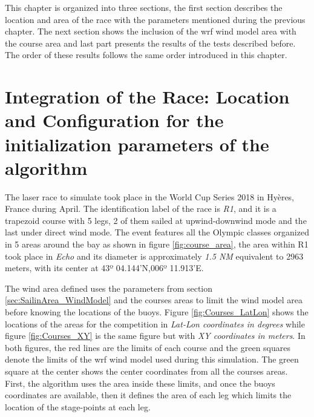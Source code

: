 This chapter is organized into three sections, the first section describes the location and area of the race with the parameters mentioned during the previous chapter. The next section shows the inclusion of the \acrshort{wrf} wind model area with the course area and last part presents the results of the tests described before. The order of these results follows the same order introduced in this chapter.   \par 


\section{Integration of the Race: Location and Configuration for the initialization parameters of the algorithm}\label{sec:details about the place}

The laser race to simulate took place in the World Cup Series 2018 in Hyères, France during April. The identification label of the race is \textit{R1}, and it is a trapezoid course with 5 legs, 2 of them sailed at upwind-downwind mode and the last under direct wind mode. The event features all the Olympic classes organized in 5 areas around the bay as shown in figure \ref{fig:course_area}, the area within R1 took place in \textit{Echo} and its diameter is approximately \textit{1.5 NM} equivalent to 2963 meters, with its center at 43º 04.144'N,006º 11.913'E. %
 \par 
 
The wind area defined uses the parameters from section \ref{sec:SailinArea_WindModel} and the courses areas to limit the wind model area before knowing the locations of the buoys. Figure \ref{fig:Courses_LatLon} shows the locations of the areas for the competition in \textit{Lat-Lon coordinates in degrees} while figure \ref{fig:Courses_XY} is the same figure but with \textit{XY coordinates in meters}. In both figures, the red lines are the limits of each course and the green squares denote the limits of the \acrshort{wrf} wind model used during this simulation. The green square at the center shows the center coordinates from all the courses areas. First, the algorithm uses the area inside these limits, and once the buoys coordinates are available, then it defines the area of each leg which limits the location of the stage-points at each leg. \par


